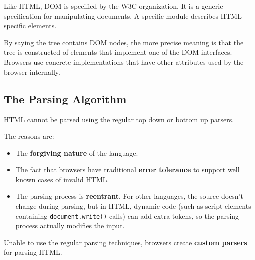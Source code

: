\documentclass[a4paper, justified, notoc]{tufte-handout} %
\begin{document}
Like HTML, DOM is specified by the W3C organization. It is a generic specification for manipulating documents. A specific module describes HTML specific elements.

By saying the tree contains DOM nodes, the more precise meaning is that the tree is constructed of elements that implement one of the DOM interfaces. Browsers use concrete implementations that have other attributes used by the browser internally.


\subsection{The Parsing Algorithm} %
\label{sub:the_parsing_algorithm}

HTML cannot be parsed using the regular top down or bottom up parsers.

The reasons are:
\begin{itemize}
	\item The \textbf{forgiving nature} of the language.
	\item The fact that browsers have traditional \textbf{error tolerance} to support well known cases of invalid HTML.
	\item The parsing process is \textbf{reentrant}. For other languages, the source doesn't change during parsing, but in HTML, dynamic code (such as script elements containing \texttt{document.write()} calls) can add extra tokens, so the parsing process actually modifies the input.
\end{itemize}

Unable to use the regular parsing techniques, browsers create \textbf{custom parsers} for parsing HTML.
\end{document}
